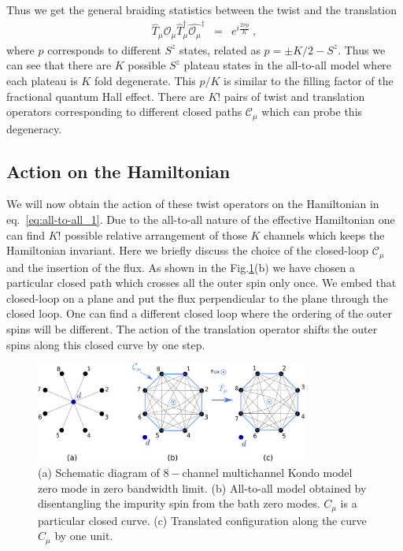 \documentclass[reprint,onecolumn,prb,superscriptaddress]{revtex4-2}
\begin{document}
Thus we get the general braiding statistics between the twist and the translation 
\begin{eqnarray}
\hat{T}_{\mu}\hat{\mathcal{O}_{\mu}} \hat{T}^{\dagger}_{\mu}\hat{\mathcal{O}_{\mu}}^{\dagger} &=& e^{i\frac{2\pi p}{K}}~,
\end{eqnarray}
where $p$ corresponds to different $S^z$ states, related as $p=\pm K/2-S^z$. Thus we can see that there are $K$ possible $S^z$ plateau states in the all-to-all model where each plateau is $K$ fold degenerate. This $p/K$ is similar to the filling factor of the fractional quantum Hall effect. There are $K!$ pairs of twist and translation operators corresponding to different closed paths $\mathcal{C}_{\mu}$ which can probe this degeneracy.

\subsection{Action on the Hamiltonian}
We will now obtain the action of these twist operators on the Hamiltonian in eq.~\ref{eq:all-to-all_1}. Due to the all-to-all nature of the effective Hamiltonian one can find $K!$ possible relative arrangement of those $K$ channels which keeps the Hamiltonian invariant. Here we briefly discuss the choice of the closed-loop $\mathcal{C}_{\mu}$ and the insertion of the flux. As shown in the {\color{blue}Fig.\ref{fig:stargraph-to-alltoall}(b)} we have chosen a particular closed path which crosses all the outer spin only once. We embed that closed-loop on a plane and put the flux perpendicular to the plane through the closed loop. One can find a different closed loop where the ordering of the outer spins will be different. The action of the translation operator shifts the outer spins along this closed curve by one step.

\begin{figure}[htpb]
	\centering
	\includegraphics[width=0.8\textwidth]{stargraphtoalltoall.png}
	\caption{(a) Schematic diagram of $8-$channel multichannel Kondo model zero mode in zero bandwidth limit. (b) All-to-all model obtained by disentangling the impurity spin from the bath zero modes. $C_{\mu}$ is a particular closed curve. (c) Translated configuration along the curve $C_{\mu}$ by one unit.}
	\label{fig:stargraph-to-alltoall}
\end{figure}
\end{document}
